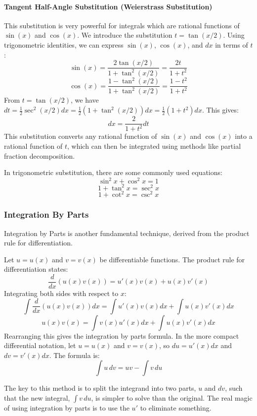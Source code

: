 \paragraph{Tangent Half-Angle Substitution (Weierstrass Substitution)}
This substitution is very powerful for integrals which are rational functions of $\sin(x)$ and $\cos(x)$.
We introduce the substitution $t = \tan(x/2)$. Using trigonometric identities, we can express $\sin(x)$, $\cos(x)$, and $dx$ in terms of $t$:
\[
\sin(x) = \frac{2\tan(x/2)}{1+\tan^2(x/2)} = \frac{2t}{1+t^2}
\]
\[
\cos(x) = \frac{1-\tan^2(x/2)}{1+\tan^2(x/2)} = \frac{1-t^2}{1+t^2}
\]
From $t = \tan(x/2)$, we have $dt = \frac{1}{2}\sec^2(x/2) dx = \frac{1}{2}(1 + \tan^2(x/2)) dx = \frac{1}{2}(1+t^2) dx$.
This gives:
\[
dx = \frac{2}{1+t^2} dt
\]
This substitution converts any rational function of $\sin(x)$ and $\cos(x)$ into a rational function of $t$, which can then be integrated using methods like partial fraction decomposition.

\begin{remark}
In trigonometric substitution, there are some commonly used equations:
\[\sin^2 x + \cos ^2 x = 1\]
\[1 + \tan^2 x = \sec^2 x\]
\[1 + \cot^2 x = \csc^2 x\]
\end{remark}

\subsubsection{Integration By Parts}
Integration by Parts is another fundamental technique, derived from the product rule for differentiation.

\begin{definition}
Let $u = u(x)$ and $v = v(x)$ be differentiable functions. The product rule for differentiation states:
\[
\frac{d}{dx}(u(x)v(x)) = u'(x)v(x) + u(x)v'(x)
\]
Integrating both sides with respect to $x$:
\[
\int \frac{d}{dx}(u(x)v(x)) dx = \int u'(x)v(x) dx + \int u(x)v'(x) dx
\]
\[
u(x)v(x) = \int v(x) u'(x) dx + \int u(x) v'(x) dx
\]
Rearranging this gives the integration by parts formula. In the more compact differential notation, let $u = u(x)$ and $v = v(x)$, so $du = u'(x)dx$ and $dv = v'(x)dx$. The formula is:
\[
\int u \, dv = uv - \int v \, du
\]
\end{definition}

The key to this method is to split the integrand into two parts, $u$ and $dv$, such that the new integral, $\int v \, du$, is simpler to solve than the original. The real magic of using integration by parts is to use the $u'$ to eliminate something.

